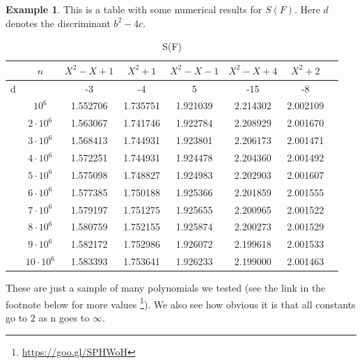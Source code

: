 \documentclass{article}
\theoremstyle{definition}
\newtheorem{example}{Example}[section]
\theoremstyle{remark}
\begin{document}
\begin{example}
This is a table with some numerical results for $S(F)$. Here $d$ denotes the discriminant $b^2-4c$.
\begin{table}[H]
\centering
\begin{tabular}{c|c|c|c|c|c|c|c}
	\hline
	 & $n$ & $X^2-X+1$& $X^2+1$ & $X^2-X-1$ & $X^2-X+4$ & $X^2+2$\\
	\hline\hline
	d & & -3 & -4 & 5 & -15 & -8 \\
	\hline
&	$10^6$ & 1.552706 & 1.735751 &1.921039 & 2.214302 & 2.002109\\
	\hline
&	$2\cdot 10^6$ & 1.563067 & 1.741746 &1.922784 & 2.208929 & 2.001670\\
	\hline
&	$3\cdot 10^6$ & 1.568413 & 1.744931 &1.923801 & 2.206173 & 2.001471\\
	\hline
&	$4\cdot 10^6$ & 1.572251 & 1.744931 &1.924478 & 2.204360 & 2.001492\\
	\hline
&	$5\cdot 10^6$ & 1.575098 & 1.748827 &1.924983 & 2.202903 & 2.001607\\
	\hline
&	$6\cdot 10^6$ &1.577385& 1.750188 &1.925366 & 2.201859 & 2.001555\\
	\hline
&	$7\cdot 10^6$ & 1.579197 & 1.751275 &1.925655 & 2.200965 & 2.001522\\
	\hline
&	$8\cdot 10^6$ & 1.580759 & 1.752155 &1.925874 & 2.200273 & 2.001529\\
	\hline
&	$9\cdot 10^6$ & 1.582172 & 1.752986 &1.926072 & 2.199618 & 2.001533\\
	\hline
&	$10 \cdot 10^6$& 1.583393 & 1.753641 & 1.926233 & 2.199000 & 2.001463\\
	\hline
\end{tabular}
\caption{S(F)}
\label{S(F) numerically for some polynomials deg2}
\end{table}

These are just a sample of many polynomials we tested (see the link in the footnote below for more values \footnote{\url{https://goo.gl/SPHWoH}}).
We also see how obvious it is that all constants go to $2$ as n goes to $\infty$.
\end{example}
\end{document}
